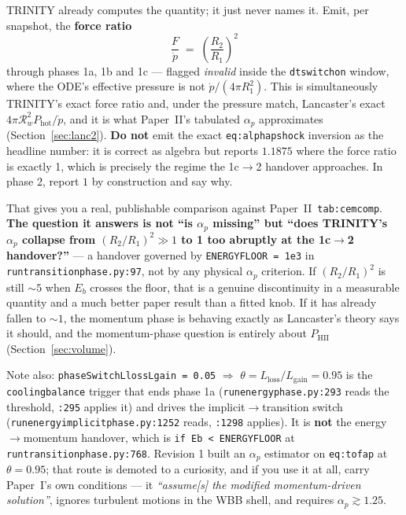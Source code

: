 \documentclass[11pt,a4paper,oneside]{report}
\newcommand{\brkus}{\textunderscore\allowbreak}
\newcommand{\code}[1]{\texttt{\small\let\_\brkus #1}}
\newcommand{\lbl}[1]{\texttt{\footnotesize\let\_\brkus #1}}
\newcommand{\PI}{Paper~I}
\newcommand{\PII}{Paper~II}
\newcommand{\Rw}{\mathcal{R}_{w}}
\newcommand{\pdotw}{\dot p}
\newcommand{\ap}{\alpha_p}
\newcommand{\PHII}{P_{\mathrm{HII}}}
\newcommand{\up}[1]{\textcolor{tqaccent}{\textbf{#1}}}
\begin{document}
TRINITY already computes the quantity; it just never names it. Emit, per snapshot, the
\up{force ratio}
\[
\frac{F}{\pdotw} \;=\; \left(\frac{R_2}{R_1}\right)^{2}
\]
through phases 1a, 1b and 1c --- flagged \emph{invalid} inside the \code{dt\_switchon} window, where
the ODE's effective pressure is not $\pdotw/(4\pi R_1^2)$. This is simultaneously TRINITY's exact
force ratio and, under the pressure match, Lancaster's exact $4\pi\Rw^2P_{\mathrm{hot}}/\pdotw$, and
it is what \PII's tabulated $\ap$ approximates (Section~\ref{sec:lanc2}). \up{Do not} emit the exact
\lbl{eq:alphap\_shock} inversion as the headline number: it is correct as algebra but reports
$1.1875$ where the force ratio is exactly 1, which is precisely the regime the 1c$\to$2 handover
approaches. In phase 2, report $1$ by construction and say why.

\begin{keybox}
That gives you a real, publishable comparison against \PII\ \lbl{tab:cem\_comp}.
\textbf{\sffamily The question it answers is not ``is $\ap$ missing'' but ``does TRINITY's
$\ap$ collapse from $(R_2/R_1)^2\gg1$ to 1 too abruptly at the 1c$\to$2 handover?''} --- a
handover governed by \code{ENERGY\_FLOOR = 1e3} in \code{run\_transition\_phase.py:97}, not
by any physical $\ap$ criterion. If $(R_2/R_1)^2$ is still ${\sim}5$ when $E_b$ crosses the
floor, that is a genuine discontinuity in a measurable quantity and a much better paper
result than a fitted knob. If it has already fallen to ${\sim}1$, the momentum phase is
behaving exactly as Lancaster's theory says it should, and the momentum-phase question is
entirely about $\PHII$ (Section~\ref{sec:volume}).
\end{keybox}

Note also: \code{phaseSwitch\_LlossLgain = 0.05} $\Rightarrow$
$\theta = L_{\mathrm{loss}}/L_{\mathrm{gain}} = 0.95$ is the \code{cooling\_balance} trigger
that ends phase 1a (\code{run\_energy\_phase.py:293} reads the threshold, \code{:295} applies it)
and drives the implicit$\to$transition switch (\code{run\_energy\_implicit\_phase.py:1252} reads,
\code{:1298} applies). It is \up{not} the energy$\to$momentum handover, which is
\code{if Eb < ENERGY\_FLOOR} at \code{run\_transition\_phase.py:768}. Revision 1 built an $\ap$ estimator on \lbl{eq:tofap} at $\theta=0.95$; that route
is demoted to a curiosity, and if you use it at all, carry \PI's own conditions --- it
\emph{``assume[s] the modified momentum-driven solution''}, ignores turbulent motions in the
WBB shell, and requires $\ap \gtrsim 1.25$.
\end{document}
